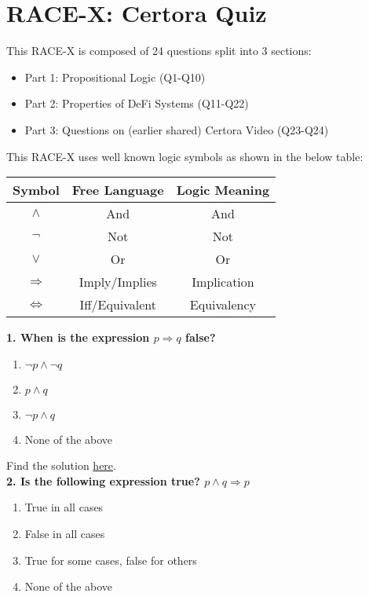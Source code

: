 \section{RACE-X: Certora Quiz}

This RACE-X is composed of 24 questions split into 3 sections:
\begin{itemize}
    \item Part 1: Propositional Logic (Q1-Q10)
    \item Part 2: Properties of DeFi Systems (Q11-Q22)
    \item Part 3: Questions on (earlier shared) Certora Video (Q23-Q24)
\end{itemize}

This RACE-X uses well known logic symbols as shown in the below table:

\begin{table}[htbp!]
    \centering
    \begin{tabular}{|c|c|c|}
        \hline
        \textbf{Symbol}&\textbf{Free Language}&\textbf{Logic Meaning}\\
        \hline
        $\wedge$&And&And\\
        $\neg$&Not&Not\\
        $\vee$&Or&Or\\
        $\Rightarrow$&Imply/Implies&Implication\\
        $\Leftrightarrow$&Iff/Equivalent&Equivalency\\
        \hline
    \end{tabular}
\end{table}

\textbf{1. When is the expression $p\Rightarrow q$ false?}

\begin{enumerate}[label=\Alph*.]
    \item $\neg p\wedge\neg q$
    \item $p\wedge q$
    \item $\neg p\wedge q$
    \item None of the above
\end{enumerate}

Find the solution \hyperref[sec:raceXcertora_q1]{here}.\\

\textbf{2. Is the following expression true? $p\wedge q\Rightarrow p$}

\begin{enumerate}[label=\Alph*.]
    \item True in all cases
    \item False in all cases
    \item True for some cases, false for others
    \item None of the above
\end{enumerate}

